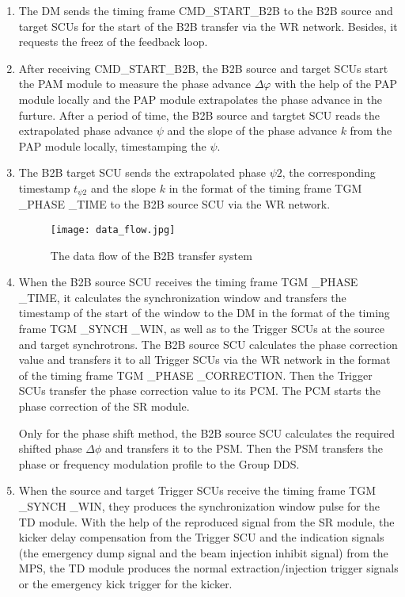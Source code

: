 \begin{enumerate}
\item The DM sends the timing frame CMD\_START\_B2B to the B2B source and target SCUs for the start of the B2B transfer via the WR network. Besides, it requests the freez of the feedback loop.

\item  After receiving CMD\_START\_B2B, the B2B source and target SCUs start the PAM module to measure the phase advance $\Delta \varphi$ with the help of the PAP module locally and the PAP module extrapolates the phase advance in the furture. After a period of time, the B2B source and targtet SCU reads the extrapolated phase advance $\psi$ and the slope of the phase advance $k$ from the PAP module locally, timestamping the $\psi$.  

\item  The B2B target SCU sends the extrapolated phase $\psi2$, the corresponding timestamp $t_{\psi2}$ and the slope $k$ in the format of the timing frame TGM \_PHASE \_TIME to the B2B source SCU via the WR network. 
\begin{figure}[!htb]
   \centering   
   \texttt{[image: data\_flow.jpg]}
   \caption{The data flow of the B2B transfer system}
   \label{data_flow}
\end{figure}  

\item  When the B2B source SCU receives the timing frame TGM \_PHASE \_TIME, it calculates the synchronization window and transfers the timestamp of the start of the window to the DM in the format of the timing frame TGM \_SYNCH \_WIN, as well as to the Trigger SCUs at the source and target synchrotrons.
The B2B source SCU calculates the phase correction value and transfers it to all Trigger SCUs via the WR network in the format of the timing frame TGM \_PHASE \_CORRECTION. Then the Trigger SCUs transfer the phase correction value to its \gls{PCM}. The PCM starts the phase correction of the SR module. 

Only for the phase shift method, the B2B source SCU calculates the required shifted phase $\Delta \phi$ and transfers it to the PSM. Then the PSM transfers the phase or frequency modulation profile to the Group DDS.  

\item  When the source and target Trigger SCUs receive the timing frame TGM \_SYNCH \_WIN, they produces the synchronization window pulse for the TD module. With the help of the reproduced signal from the SR module, the kicker delay compensation from the Trigger SCU and the indication signals (the emergency dump signal and the beam injection inhibit signal) from the MPS, the TD module produces the normal extraction/injection trigger signals or the emergency kick trigger for the kicker.  


\end{enumerate}
